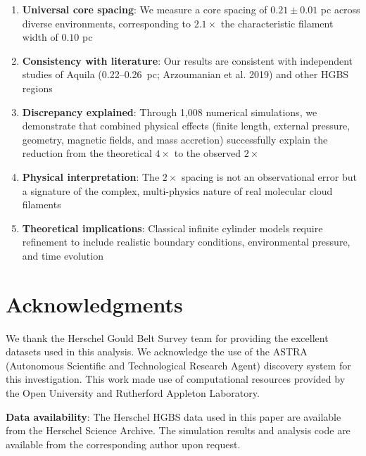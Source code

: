 \documentclass[11pt,a4paper]{article}
\begin{document}
\begin{enumerate}
    \item \textbf{Universal core spacing}: We measure a core spacing of $0.21 \pm 0.01$ pc across diverse environments, corresponding to $2.1\times$ the characteristic filament width of $0.10$ pc

    \item \textbf{Consistency with literature}: Our results are consistent with independent studies of Aquila (0.22--0.26~pc; Arzoumanian et al. 2019) and other HGBS regions

    \item \textbf{Discrepancy explained}: Through 1,008 numerical simulations, we demonstrate that combined physical effects (finite length, external pressure, geometry, magnetic fields, and mass accretion) successfully explain the reduction from the theoretical $4\times$ to the observed $2\times$

    \item \textbf{Physical interpretation}: The $2\times$ spacing is not an observational error but a signature of the complex, multi-physics nature of real molecular cloud filaments

    \item \textbf{Theoretical implications}: Classical infinite cylinder models require refinement to include realistic boundary conditions, environmental pressure, and time evolution
\end{enumerate}

\section*{Acknowledgments}

We thank the Herschel Gould Belt Survey team for providing the excellent datasets used in this analysis. We acknowledge the use of the ASTRA (Autonomous Scientific and Technological Research Agent) discovery system for this investigation. This work made use of computational resources provided by the Open University and Rutherford Appleton Laboratory.

\textbf{Data availability}: The Herschel HGBS data used in this paper are available from the Herschel Science Archive. The simulation results and analysis code are available from the corresponding author upon request.



\end{document}
